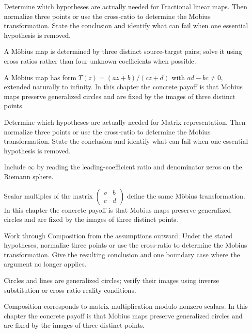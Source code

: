 \begin{exercise}\label{exr:iv16-01}
Determine which hypotheses are actually needed for Fractional linear maps. Then normalize three points or use the cross-ratio to determine the Mobius transformation. State the conclusion and identify what can fail when one essential hypothesis is removed.
\end{exercise}
\begin{hint}
A Möbius map is determined by three distinct source-target pairs; solve it using cross ratios rather than four unknown coefficients when possible.
\end{hint}
\begin{solution}
A Möbius map has form $T(z)=(az+b)/(cz+d)$ with $ad-bc\ne0$, extended naturally to infinity. In this chapter the concrete payoff is that Mobius maps preserve generalized circles and are fixed by the images of three distinct points.
\end{solution}

\begin{exercise}\label{exr:iv16-02}
Determine which hypotheses are actually needed for Matrix representation. Then normalize three points or use the cross-ratio to determine the Mobius transformation. State the conclusion and identify what can fail when one essential hypothesis is removed.
\end{exercise}
\begin{hint}
Include \(\infty\) by reading the leading-coefficient ratio and denominator zeros on the Riemann sphere.
\end{hint}
\begin{solution}
Scalar multiples of the matrix $\begin{pmatrix}a&b\\c&d\end{pmatrix}$ define the same Möbius transformation. In this chapter the concrete payoff is that Mobius maps preserve generalized circles and are fixed by the images of three distinct points.
\end{solution}

\begin{exercise}\label{exr:iv16-03}
Work through Composition from the assumptions outward. Under the stated hypotheses, normalize three points or use the cross-ratio to determine the Mobius transformation. Give the resulting conclusion and one boundary case where the argument no longer applies.
\end{exercise}
\begin{hint}
Circles and lines are generalized circles; verify their images using inverse substitution or cross-ratio reality conditions.
\end{hint}
\begin{solution}
Composition corresponds to matrix multiplication modulo nonzero scalars. In this chapter the concrete payoff is that Mobius maps preserve generalized circles and are fixed by the images of three distinct points.
\end{solution}


